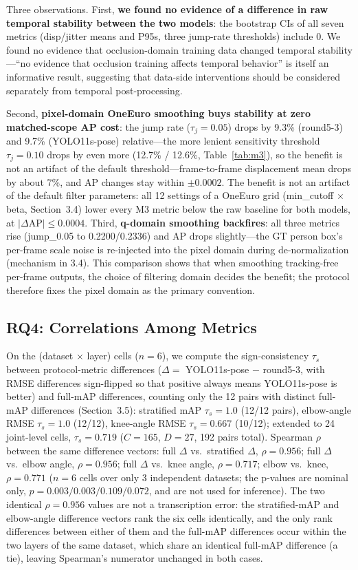\documentclass[10pt,conference]{IEEEtran}
\begin{document}
Three observations. First, \textbf{we found no evidence of a difference in raw temporal stability between the two models}: the bootstrap CIs of all seven metrics (disp/jitter means and P95s, three jump-rate thresholds) include 0. We found no evidence that occlusion-domain training data changed temporal stability---``no evidence that occlusion training affects temporal behavior'' is itself an informative result, suggesting that data-side interventions should be considered separately from temporal post-processing.

Second, \textbf{pixel-domain OneEuro smoothing buys stability at zero matched-scope AP cost}: the jump rate ($\tau_j=0.05$) drops by 9.3\% (round5-3) and 9.7\% (YOLO11s-pose) relative---the more lenient sensitivity threshold $\tau_j=0.10$ drops by even more (12.7\% / 12.6\%, Table~\ref{tab:m3}), so the benefit is not an artifact of the default threshold---frame-to-frame displacement mean drops by about 7\%, and AP changes stay within $\pm0.0002$. The benefit is not an artifact of the default filter parameters: all 12 settings of a OneEuro grid (min\_cutoff $\times$ beta, Section~3.4) lower every M3 metric below the raw baseline for both models, at $|\Delta\mathrm{AP}|\le 0.0004$. Third, \textbf{q-domain smoothing backfires}: all three metrics rise (jump\_0.05 to 0.2200/0.2336) and AP drops slightly---the GT person box's per-frame scale noise is re-injected into the pixel domain during de-normalization (mechanism in 3.4). This comparison shows that when smoothing tracking-free per-frame outputs, the choice of filtering domain decides the benefit; the protocol therefore fixes the pixel domain as the primary convention.

\subsection{RQ4: Correlations Among Metrics}

On the (dataset $\times$ layer) cells ($n=6$), we compute the sign-consistency $\tau_s$ between protocol-metric differences ($\Delta=$ YOLO11s-pose $-$ round5-3, with RMSE differences sign-flipped so that positive always means YOLO11s-pose is better) and full-mAP differences, counting only the 12 pairs with distinct full-mAP differences (Section~3.5): stratified mAP $\tau_s=1.0$ (12/12 pairs), elbow-angle RMSE $\tau_s=1.0$ (12/12), knee-angle RMSE $\tau_s=0.667$ (10/12); extended to 24 joint-level cells, $\tau_s=0.719$ ($C{=}165$, $D{=}27$, 192 pairs total). Spearman $\rho$ between the same difference vectors: full $\Delta$ vs.\ stratified $\Delta$, $\rho=0.956$; full $\Delta$ vs.\ elbow angle, $\rho=0.956$; full $\Delta$ vs.\ knee angle, $\rho=0.717$; elbow vs.\ knee, $\rho=0.771$ ($n=6$ cells over only 3 independent datasets; the p-values are nominal only, $p=0.003/0.003/0.109/0.072$, and are not used for inference). The two identical $\rho=0.956$ values are not a transcription error: the stratified-mAP and elbow-angle difference vectors rank the six cells identically, and the only rank differences between either of them and the full-mAP differences occur within the two layers of the same dataset, which share an identical full-mAP difference (a tie), leaving Spearman's numerator unchanged in both cases.
\end{document}
